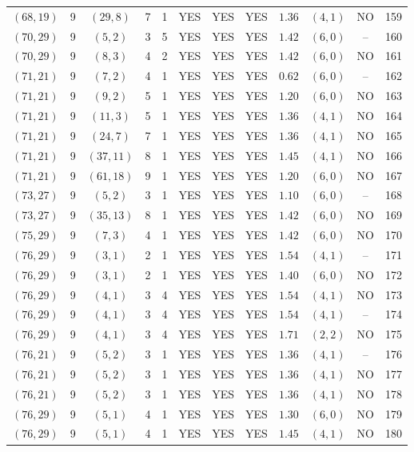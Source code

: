 \begin{longtable}{|c|c|c|c|c|c|c|c|c|c|c|c|}
$(68,19)$ & 9 & $(29,8)$ & 7 & 1 & YES & YES & YES & $1.36$ & $(4,1)$ & NO & 159\\
$(70,29)$ & 9 & $(5,2)$ & 3 & 5 & YES & YES & YES & $1.42$ & $(6,0)$ & -- & 160\\
$(70,29)$ & 9 & $(8,3)$ & 4 & 2 & YES & YES & YES & $1.42$ & $(6,0)$ & NO & 161\\
$(71,21)$ & 9 & $(7,2)$ & 4 & 1 & YES & YES & YES & $0.62$ & $(6,0)$ & -- & 162\\
$(71,21)$ & 9 & $(9,2)$ & 5 & 1 & YES & YES & YES & $1.20$ & $(6,0)$ & NO & 163\\
$(71,21)$ & 9 & $(11,3)$ & 5 & 1 & YES & YES & YES & $1.36$ & $(4,1)$ & NO & 164\\
$(71,21)$ & 9 & $(24,7)$ & 7 & 1 & YES & YES & YES & $1.36$ & $(4,1)$ & NO & 165\\
$(71,21)$ & 9 & $(37,11)$ & 8 & 1 & YES & YES & YES & $1.45$ & $(4,1)$ & NO & 166\\
$(71,21)$ & 9 & $(61,18)$ & 9 & 1 & YES & YES & YES & $1.20$ & $(6,0)$ & NO & 167\\
$(73,27)$ & 9 & $(5,2)$ & 3 & 1 & YES & YES & YES & $1.10$ & $(6,0)$ & -- & 168\\
$(73,27)$ & 9 & $(35,13)$ & 8 & 1 & YES & YES & YES & $1.42$ & $(6,0)$ & NO & 169\\
$(75,29)$ & 9 & $(7,3)$ & 4 & 1 & YES & YES & YES & $1.42$ & $(6,0)$ & NO & 170\\
$(76,29)$ & 9 & $(3,1)$ & 2 & 1 & YES & YES & YES & $1.54$ & $(4,1)$ & -- & 171\\
$(76,29)$ & 9 & $(3,1)$ & 2 & 1 & YES & YES & YES & $1.40$ & $(6,0)$ & NO & 172\\
$(76,29)$ & 9 & $(4,1)$ & 3 & 4 & YES & YES & YES & $1.54$ & $(4,1)$ & NO & 173\\
$(76,29)$ & 9 & $(4,1)$ & 3 & 4 & YES & YES & YES & $1.54$ & $(4,1)$ & -- & 174\\
$(76,29)$ & 9 & $(4,1)$ & 3 & 4 & YES & YES & YES & $1.71$ & $(2,2)$ & NO & 175\\
$(76,21)$ & 9 & $(5,2)$ & 3 & 1 & YES & YES & YES & $1.36$ & $(4,1)$ & -- & 176\\
$(76,21)$ & 9 & $(5,2)$ & 3 & 1 & YES & YES & YES & $1.36$ & $(4,1)$ & NO & 177\\
$(76,21)$ & 9 & $(5,2)$ & 3 & 1 & YES & YES & YES & $1.36$ & $(4,1)$ & NO & 178\\
$(76,29)$ & 9 & $(5,1)$ & 4 & 1 & YES & YES & YES & $1.30$ & $(6,0)$ & NO & 179\\
$(76,29)$ & 9 & $(5,1)$ & 4 & 1 & YES & YES & YES & $1.45$ & $(4,1)$ & NO & 180\\

\end{longtable}
